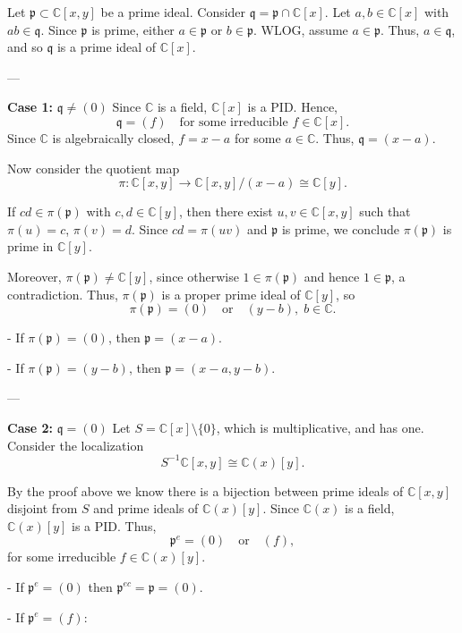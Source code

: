 \documentclass[12pt, letterpaper]{article}
\newcommand{\p}{\mathfrak{p}}
\begin{document}
\begin{problemproof}
    Let $\mathfrak{p} \subset \mathbb{C}[x,y]$ be a prime ideal.  
Consider $\mathfrak{q} = \mathfrak{p} \cap \mathbb{C}[x]$. Let $a,b \in \mathbb{C}[x]$ with $ab \in \mathfrak{q}$.  
Since $\mathfrak{p}$ is prime, either $a \in \mathfrak{p}$ or $b \in \mathfrak{p}$. WLOG, assume $a \in \mathfrak{p}$.  
Thus, $a \in \mathfrak{q}$, and so $\mathfrak{q}$ is a prime ideal of $\mathbb{C}[x]$.

---

\textbf{Case 1:} $\mathfrak{q} \neq (0)$
Since $\mathbb{C}$ is a field, $\mathbb{C}[x]$ is a PID. Hence,  
\[
\mathfrak{q} = (f) \quad \text{for some irreducible } f \in \mathbb{C}[x].
\]
Since $\mathbb{C}$ is algebraically closed, $f = x-a$ for some $a \in \mathbb{C}$.  
Thus, $\mathfrak{q} = (x-a)$.

Now consider the quotient map
\[
\pi : \mathbb{C}[x,y] \to \mathbb{C}[x,y]/(x-a) \cong \mathbb{C}[y].
\]

If $cd \in \pi(\mathfrak{p})$ with $c,d \in \mathbb{C}[y]$, then there exist $u,v \in \mathbb{C}[x,y]$ such that $\pi(u)=c$, $\pi(v)=d$.  
Since $cd = \pi(uv)$ and $\mathfrak{p}$ is prime, we conclude $\pi(\mathfrak{p})$ is prime in $\mathbb{C}[y]$.

Moreover, $\pi(\mathfrak{p}) \neq \mathbb{C}[y]$, since otherwise $1 \in \pi(\mathfrak{p})$ and hence $1 \in \mathfrak{p}$, a contradiction.  
Thus, $\pi(\mathfrak{p})$ is a proper prime ideal of $\mathbb{C}[y]$, so
\[
\pi(\mathfrak{p}) = (0) \quad \text{or} \quad (y-b), \; b \in \mathbb{C}.
\]

- If $\pi(\mathfrak{p}) = (0)$, then $\mathfrak{p} = (x-a)$.

- If $\pi(\mathfrak{p}) = (y-b)$, then $\mathfrak{p} = (x-a, y-b)$.

---

\textbf{Case 2:} $\mathfrak{q} = (0)$
Let $S = \mathbb{C}[x] \setminus \{0\}$, which is multiplicative, and has one.
Consider the localization
\[
S^{-1}\mathbb{C}[x,y] \cong \mathbb{C}(x)[y].
\]

By the proof above we know there is a bijection between prime ideals of $\mathbb{C}[x,y]$ disjoint from $S$ and prime ideals of $\mathbb{C}(x)[y]$.  
Since $\mathbb{C}(x)$ is a field, $\mathbb{C}(x)[y]$ is a PID. Thus,
\[
\mathfrak{p}^e = (0) \quad \text{or} \quad (f),
\]
for some irreducible $f \in \mathbb{C}(x)[y]$.

- If $\p^{e}=(0)$ then $\p^{ec}=\p=(0)$.

- If $\p^{e}=(f)$:


\end{problemproof}
\end{document}
